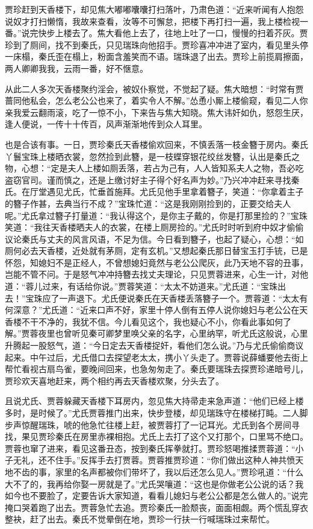 \documentclass[12pt,oneside]{book}
\begin{document}
贾珍赶到天香楼下，却见焦大嘟嘟囔囔打扫落叶，乃肃色道：“近来听闻有人抱怨说奴才打扫懒惰，我故来查看，汝等不可懈怠，把楼下再打扫一遍，我上楼检视一番。”说完快步上楼去了。焦大看他上去了，往地上吐了一口，慢慢的扫着芥灰。贾珍到了厕间，找不到秦氏，只见瑞珠向他招手。贾珍喜冲冲进了室内，看见里头停一床榻，秦氏歪在榻上，粉面含羞笑而不语。瑞珠退了出去。贾珍上前揽肩擦面，两人卿卿我我，云雨一番，好不惬意。   

从此二人多次天香楼聚约淫会，被奴仆察觉，不觉起了疑。焦大暗想：“时常有贾蔷同他私会，怎么老公公也来了，着实令人不解。”怂恿小厮上楼偷窥，看见二人你亲我爱云翻雨滚，吃了一惊不小，下来告与焦大知晓。焦大讳奸如仇，怒怨生厌，逢人便说，一传十十传百，风声渐渐地传到众人耳里。

也是合该有事。一日，贾珍秦氏天香楼偷欢回来，不慎丢落一枝金簪于房内。秦氏丫鬟宝珠上楼晒衣裳，忽然捡到此簪，是一枝蝶穿银花绞丝发簪，认出是秦氏之物，心想：“定是夫人上楼如厕丢落，若占为己有，人人皆知系夫人之物，吾必吃盗窃官司。谨而慎之，还是上缴讨好主子得个好名声为妙。”乃兴冲冲赶来寻找秦氏。在厅堂遇见尤氏，忙垂首施拜。尤氏见他手里拿着簪子，笑道：“你拿着主子的簪子作甚，去典当行不成？”宝珠忙道：“这是我刚刚捡到的，正要交给夫人呢。”尤氏拿过簪子打量道：“我认得这个，是你主子戴的，你是打那里捡的？”宝珠笑道：“我往天香楼晒夫人的衣裳，在楼上厕房捡的。”尤氏时时听到府中奴才偷偷议论秦氏与丈夫的风言风语，不足为信。今日看到簪子，也起了疑心，心想：“如厕何必去天香楼，近处就有茅厕，定有玄机。”又想起秦氏那日替宝玉打手铳，已是怀怨，知媳妇不是正经人，不曾想媳妇竟然与老公公爬灰，此乃天地不容的丑事，岂能不管不问。于是怒气冲冲持簪去找丈夫理论，只见贾蓉进来，心生一计，对他道：“蓉儿过来，有话给你说。”贾蓉笑道：“太太不妨道来。”尤氏道：“宝珠出去！”宝珠应了一声退下。尤氏便说秦氏在天香楼丢落簪子一个。贾蓉道：“太太有何深意？”尤氏道：“近来口声不好，家里十停人倒有五停人说你媳妇与老公公在天香楼不干不净的，我犹不信。今儿看见这个，我也疑心不小，你看此事如何了解。”贾蓉夜里也曾听见秦可卿梦里唤父亲的名字，心里纳罕，听尤氏这般说，心里升腾起一股怒气，道：“今日定去天香楼捉奸，看他们怎么说。”乃与尤氏偷偷商议起来。中午过后，尤氏借口去探望老太太，携小丫头走了。贾蓉说薛蟠要他去街上帮忙看视古扇鸟雀，要晚间回来，也急匆匆走了。秦氏要瑞珠去探贾珍递暗号儿，贾珍欢天喜地赶来，两个相约再去天香楼欢聚，分头去了。

且说尤氏、贾蓉躲藏天香楼下耳房内，忽见焦大持帚走来急声道：“他们已经上楼多时，是时候了。”尤氏贾蓉推门出来，快步登楼，却见瑞珠守在楼梯打盹。二人脚步声惊醒瑞珠，唬的他急忙往楼上赶，被贾蓉打了一记耳光。尤氏到各个房间寻找，果见贾珍秦氏在房里赤裸相抱。尤氏上去打了这个又打那个，口里骂不绝口。贾蓉也窜了进来，看见这番丑态，按到秦氏挥拳就打。贾珍怒喝推揉贾蓉道：“小子无礼，还不住手。”反挥手去打贾蓉。贾蓉推贾珍道：“你们做出这种人神共愤天地不齿的事，家里的名声都被你们带坏了，我以后还怎么见人。”贾珍吼道：“什么大不了的，我再给你娶一房就是了。”尤氏哭嚷道：“这也是你做老公公说的话？我如今也不要脸了，定要告诉大家知道，看看儿媳妇与老公公都是怎么做人的。”说完掩口哭着跑了出去。贾蓉急忙去追。贾珍秦氏一脸颓丧，面面相觑。两个慌乱穿衣整袂，赶了出去。秦氏不觉晕倒在地，贾珍一行扶一行喊瑞珠过来帮忙。
\end{document}
